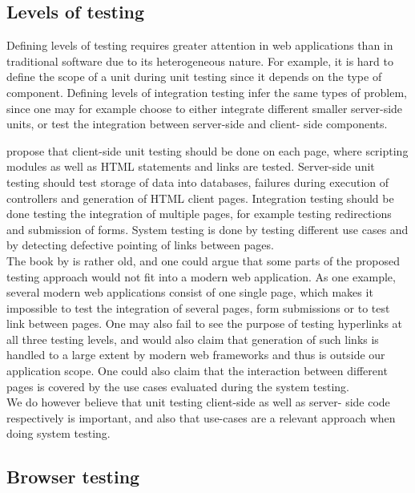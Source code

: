 \subsection{Levels of testing}

Defining levels of testing requires greater attention in web
applications than in traditional software due to its heterogeneous
nature. For example, it is hard to define the scope of a unit during
unit testing since it depends on the type of component. Defining levels
of integration testing infer the same types of problem, since one may
for example choose to either integrate different smaller server-side
units, or test the integration between server-side and client- side
components. \cite{book:web}

\citeauthor{book:web} propose that client-side unit testing should be
done on each page, where scripting modules as well as HTML statements
and links are tested. Server-side unit testing should test storage of
data into databases, failures during execution of controllers and
generation of HTML client pages. Integration testing should be done
testing the integration of multiple pages, for example testing
redirections and submission of forms. System testing is done by testing
different use cases and by detecting defective pointing of links between
pages.\\

The book by \citeauthor{book:web} is rather old, and one could argue
that some parts of the proposed testing approach would not fit into a
modern web application. As one example, several modern web applications
consist of one single page, which makes it impossible to test the
integration of several pages, form submissions or to test link between
pages. One may also fail to see the purpose of testing hyperlinks at all
three testing levels, and would also claim that generation of such links
is handled to a large extent by modern web frameworks and thus is
outside our application scope. One could also claim that the interaction
between different pages is covered by the use cases evaluated during the
system testing.\\

We do however believe that unit testing client-side as well as server-
side code respectively is important, and also that use-cases are a
relevant approach when doing system testing.\\


\subsection{Browser testing}

